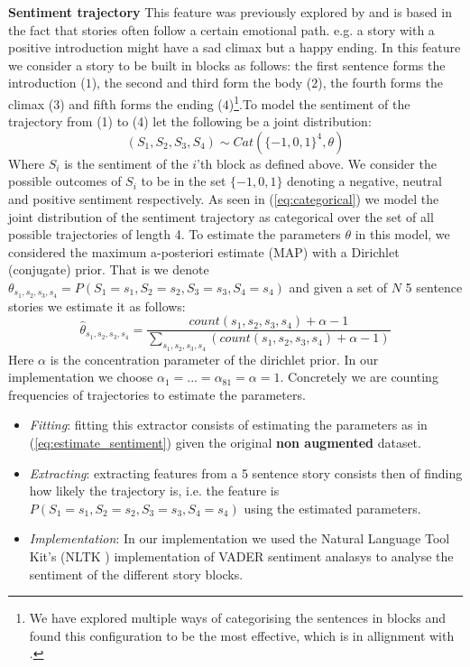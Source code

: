 \documentclass{article}
\begin{document}
\textbf{Sentiment trajectory} This feature was previously explored by \cite{COGCOMP} and is based in the fact that stories often follow a certain emotional path. e.g. a story with a positive introduction might have a sad climax but a happy ending. In this feature we consider a story to be built in blocks as follows: the first sentence forms the introduction ($1$), the second and third form the body ($2$), the fourth forms the climax ($3$) and fifth forms the ending ($4$)\footnote{We have explored multiple ways of categorising the sentences in blocks and found this configuration to be the most effective, which is in allignment with \cite{COGCOMP}.}.To model the sentiment of the trajectory from (1) to (4) let the following be a joint distribution:
\begin{equation}
\label{eq:categorical}
(S_1, S_2,S_3,S_4) \sim Cat(\{-1,0,1\}^4, \theta)
\end{equation}
Where $S_i$ is the sentiment of the $i$'th block as defined above. We consider the possible outcomes of $S_i$ to be in the set $\{-1,0,1\}$ denoting a negative, neutral and positive sentiment respectively.  As seen in (\ref{eq:categorical}) we model the joint distribution of the sentiment trajectory as categorical over the set of all possible trajectories of length 4. To estimate the parameters $\theta$ in this model, we considered the maximum a-posteriori estimate (MAP) with a Dirichlet (conjugate) prior. That is we denote $\theta_{s_1,s_2,s_3,s_4} = P(S_1 = s_1, S_2=s_2, S_3=s_3, S_4=s_4)$ and given a set of $N$ 5 sentence stories we estimate it as follows:
\begin{equation}
\label{eq:estimate_sentiment}
\hat{\theta}_{s_1,s_2,s_3,s_4} = \frac{count(s_1,s_2,s_3,s_4) + \alpha - 1}{\sum\limits_{s_1,s_2,s_3,s_4}(count(s_1,s_2,s_3,s_4) + \alpha-1) }
\end{equation}
Here $\alpha$ is the concentration parameter of the dirichlet prior. In our implementation we choose $\alpha_1 = ... = \alpha_{81} = \alpha = 1$. Concretely we are counting frequencies of trajectories to estimate the parameters.
\begin{itemize}
	\item \textit{Fitting}: fitting this extractor consists of estimating the parameters as in (\ref{eq:estimate_sentiment}) given the original \textbf{non augmented} dataset.
	\item \textit{Extracting}: extracting features from a 5 sentence story consists then of finding how likely the trajectory is, i.e. the feature is $P(S_1 = s_1, S_2=s_2, S_3=s_3, S_4=s_4)$ using the estimated parameters.
	\item \textit{Implementation}: In our implementation we used the Natural Language Tool Kit's (NLTK \cite{NLTK_VADER}) implementation of VADER sentiment analasys \cite{VADER} to analyse the sentiment of the different story blocks.
\end{itemize}
\end{document}
